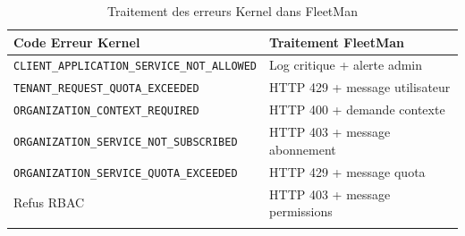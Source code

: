 \documentclass[12pt,a4paper]{report}
\begin{document}
\begin{longtable}{p{7cm}p{6cm}}
\toprule
\textbf{Code Erreur Kernel} & \textbf{Traitement FleetMan} \\
\midrule
\endhead
\texttt{CLIENT\_APPLICATION\_SERVICE\_NOT\_ALLOWED} & Log critique + alerte admin \\
\texttt{TENANT\_REQUEST\_QUOTA\_EXCEEDED} & HTTP 429 + message utilisateur \\
\texttt{ORGANIZATION\_CONTEXT\_REQUIRED} & HTTP 400 + demande contexte \\
\texttt{ORGANIZATION\_SERVICE\_NOT\_SUBSCRIBED} & HTTP 403 + message abonnement \\
\texttt{ORGANIZATION\_SERVICE\_QUOTA\_EXCEEDED} & HTTP 429 + message quota \\
Refus RBAC & HTTP 403 + message permissions \\
\bottomrule
\caption{Traitement des erreurs Kernel dans FleetMan}
\end{longtable}
\end{document}
